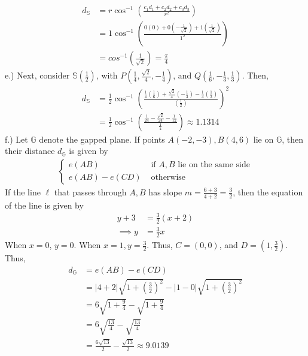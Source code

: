 \documentclass{report}
\begin{document}
    \begin{align*}
        d_{\mathbb{S}} &= r\cos^{-1}{\left(\frac{c_{1}d_{1} + c_{2}d_{2} + c_{3}d_{3}}{r^{2}}\right)} \\
                       &= 1\cos^{-1}{\left(\frac{0(0) +0\left(-\frac{1}{\sqrt{2}}\right) + 1\left(\frac{1}{\sqrt{2}}\right)}{1^{2}}\right)} \\
                       &= cos^{-1}\left(\frac{1}{\sqrt{2}}\right) = \frac{\pi}{4}
    \end{align*}
    e.) Next, consider $\mathbb{S}\left(\frac{1}{2}\right)$, with $P\left(\frac{1}{4}, \frac{\sqrt{2}}{4}, -\frac{1}{4}\right)$, and $Q\left(\frac{1}{6}, -\frac{1}{3}, \frac{1}{3}\right) $. Then,
    \begin{align*}
        d_{\mathbb{S}} &= \frac{1}{2}\cos^{-1}{\left(\frac{\frac{1}{4}\left(\frac{1}{6}\right) + \frac{\sqrt{2}}{4}\left(-\frac{1}{3}\right) -\frac{1}{4}\left(\frac{1}{3}\right) }{\left(\frac{1}{2}\right)}\right)^{2}} \\
        &= \frac{1}{2}\cos^{-1}{\left(\frac{ \frac{1}{24} - \frac{\sqrt{2}}{24} -\frac{1}{12}  }{\frac{1}{4}}\right)} \approx 1.1314
    \end{align*}
    f.) Let $\mathbb{G}$ denote the gapped plane. If points $A(-2,-3), B(4,6)$ lie on $\mathbb{G}$, then their distance $d_{\mathbb{G}}$ is given by
    \begin{align*}
        \begin{cases}
            e(AB) &\text{ if $A,B$ lie on the same side}      \\
            e(AB) - e(CD) & \text{ otherwise}
        \end{cases}
    \end{align*}
    If the line $\ell$ that passes through $A,B$ has slope $m= \frac{6+3}{4+2} = \frac{3}{2} $, then the equation of the line is given by
    \begin{align*}
        y  +3 &= \frac{3}{2}(x+2) \\
        \implies  y &= \frac{3}{2}x
    \end{align*}
    When $x=0$, $y=0$. When $x=1, y=\frac{3}{2}$. Thus, $C = (0,0)$, and $D = \left(1,\frac{3}{2}\right) $. Thus,
    \begin{align*}
        d_{\mathbb{G}} &= e(AB) - e(CD) \\
                       &= \bigg\lvert 4+2 \bigg\rvert\sqrt{1 + \left(\frac{3}{2}\right)^{2}} - \bigg\lvert 1-0 \bigg\rvert\sqrt{1+\left(\frac{3}{2}\right)^{2}} \\
                       &= 6\sqrt{1+\frac{9}{4}} - \sqrt{1+\frac{9}{4}} \\
                       &= 6\sqrt{\frac{13}{4}} - \sqrt{\frac{13}{4}} \\
                       &= \frac{6\sqrt{13}}{2} - \frac{\sqrt{13}}{2} \approx 9.0139
    \end{align*}
\end{document}
